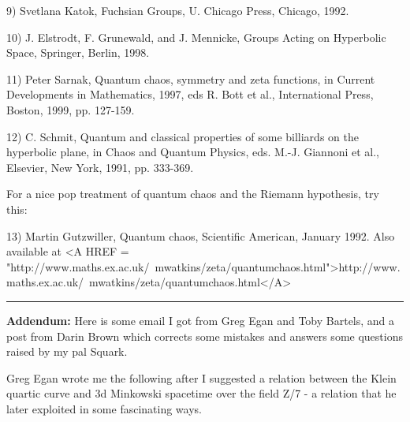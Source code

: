 9) Svetlana Katok, Fuchsian Groups, U. Chicago Press, Chicago, 1992.

10) J. Elstrodt, F. Grunewald, and J. Mennicke, Groups Acting on 
Hyperbolic Space, Springer, Berlin, 1998.

11) Peter Sarnak, Quantum chaos, symmetry and zeta functions, in 
Current Developments in Mathematics, 1997, eds R. Bott et al., 
International Press, Boston, 1999, pp. 127-159.

12) C. Schmit, Quantum and classical properties of some billiards 
on the hyperbolic plane, in Chaos and Quantum Physics, eds.
M.-J. Giannoni et al., Elsevier, New York, 1991, pp. 333-369.

For a nice pop treatment of quantum chaos and the Riemann hypothesis,
try this:

13) Martin Gutzwiller, Quantum chaos, Scientific American, January
1992.  Also available at <A HREF = "http://www.maths.ex.ac.uk/~mwatkins/zeta/quantumchaos.html">http://www.maths.ex.ac.uk/~mwatkins/zeta/quantumchaos.html</A>

\par\noindent\rule{\textwidth}{0.4pt}
\textbf{Addendum:} Here is some email I got from Greg Egan and Toby Bartels,
and a post from Darin Brown which corrects some mistakes and answers
some questions raised by my pal Squark.

Greg Egan wrote me the following after I suggested a relation
between the Klein quartic curve and 3d Minkowski spacetime over the
field Z/7 - a relation that he later exploited in some fascinating
ways.


